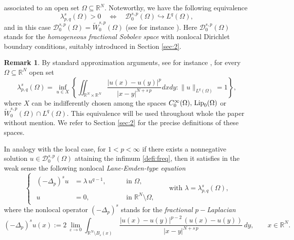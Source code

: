 \documentclass{amsart}
\theoremstyle{definition}
\newtheorem{remark}[theorem]{Remark}
\numberwithin{equation}{section}
\begin{document}
	associated to an open set $\Omega \subseteq \mathbb{R}^N$. Noteworthy, we have the following equivalence 
	\[
	\lambda^s_{p, q}(\Omega) > 0 \quad \Longleftrightarrow \quad \mathcal{D}^{s,p}_0(\Omega) \hookrightarrow L^q(\Omega),
	\]
	and in this case $\mathcal{D}^{s,p}_0(\Omega)= \widetilde{W}^{s,p}_0(\Omega)$ (see for instance \cite[Corollary 1.2, Theorem 1.3 \& Lemma 2.3]{franzina-torsion}). Here $\mathcal{D}^{s,p}_0(\Omega)$ stands for the {\it homogeneous fractional Sobolev space} with nonlocal Dirichlet boundary conditions, suitably introduced in Section \ref{sec:2}.
	
	\begin{remark} \label{rmk:relax}
		By standard approximation arguments, see for instance \cite[Lemma 11]{FSV}, for every $\Omega \subseteq \mathbb{R}^N$ open set  
		\[
		\lambda_{p,q}^s(\Omega) = \inf_{u \in X} \left\{\iint_{\mathbb{R}^N \times \mathbb{R}^N} \frac{|u(x)-u(y)|^p}{|x-y|^{N+s\,p}}dxdy : \|u\|_{L^q(\Omega)} = 1\right\},
		\]
		where $X$ can be indifferently chosen among the spaces $C^\infty_0(\Omega),\,{\rm Lip}_0(\Omega)$ or $\widetilde{W}^{s,p}_0(\Omega) \cap L^q(\Omega)$. This equivalence will be used throughout whole the paper without mention. We refer to Section \ref{sec:2} for the precise definitions of these spaces. 
	\end{remark} 
	In analogy with the local case, for $1 < p < \infty$ if there exists a nonnegative solution $u \in \mathcal{D}^{s,p}_0(\Omega)$ attaining the infimum \eqref{defi:freq}, then it satisfies in the weak sense the following nonlocal {\it Lane-Emden-type equation}
	\[
	\begin{cases}
		\begin{aligned}
			(-\Delta_p)^s u &= \lambda\,u^{q-1}, &&\quad \mbox{ in } \Omega,\\
			\\
			u&=0, &&\quad \mbox{ in } \mathbb{R}^N \setminus \Omega,
		\end{aligned}
	\end{cases}
	\quad \mbox{ with } \lambda = \lambda^s_{p, q}(\Omega),
	\]
	where the nonlocal operator $(-\Delta_p)^s$ stands for the {\it fractional $p-$Laplacian}
	\[
	(-\Delta_p)^s u(x) := 2\,\lim_{\varepsilon \to 0} \int_{\mathbb{R}^N \setminus B_\varepsilon(x)}\,\frac{|u(x) - u(y)|^{p-2}\,(u(x) - u(y))}{|x-y|^{N+s\,p}}\,dy, \qquad x \in \mathbb{R}^N. 
	\]
	
\end{document}
